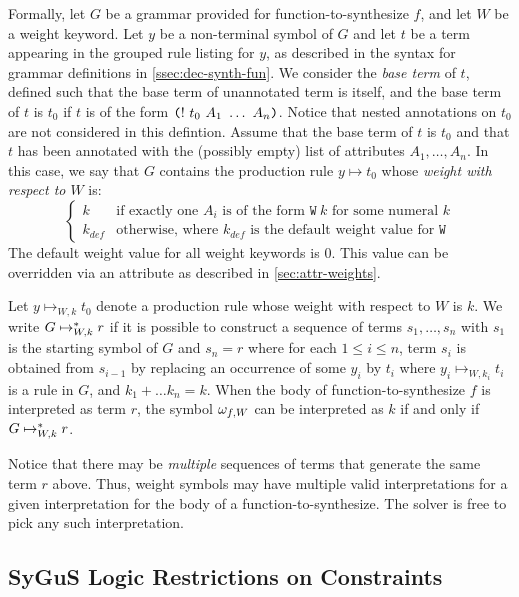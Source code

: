\documentclass[english,a4paper,10pt]{article}
\begin{document}
Formally,
let $G$ be a grammar provided for function-to-synthesize $f$, and let $W$ be a weight keyword.
Let $y$ be a non-terminal symbol of $G$ and let $t$ be a term appearing
in the grouped rule listing for $y$, as described in the syntax for grammar
definitions in \cref{ssec:dec-synth-fun}.
We consider the \emph{base term} of $t$, defined such that
the base term of unannotated term is itself, and
the base term of $t$ is $t_0$ if $t$ is of the form 
$\texttt{(}!\mbox{ }t_0\mbox{ }A_1\mbox{ }\ldots\mbox{ }A_n\texttt{)}$.
Notice that nested annotations on $t_0$ are not considered in this defintion.
Assume that the base term of $t$ is $t_0$ and that
$t$ has been annotated with the (possibly empty) list of attributes $A_1, \ldots, A_n$.
In this case, we say that $G$ contains
the production rule $y \mapsto t_0$ whose \emph{weight with respect to $W$} is:
\[
\begin{cases}
k & \text{if exactly one } A_i \text{ is of the form } \texttt{W}\ k \text{ for some numeral } k \\
k_{def} & \text{otherwise, where } k_{def} \text{ is the default weight value for } \texttt{W}
\end{cases}
\]
The default weight value for all weight keywords is $0$.
This value can be overridden via an attribute as described in \cref{sec:attr-weights}.

Let $y \mapsto_{W,k} t_0$ denote a production rule
whose weight with respect to $W$ is $k$.
We write $G \mapsto_{W,k}^{\ast} r$ if it is possible to construct a sequence of terms
$s_1, \ldots, s_n$
with $s_1$ is the starting symbol of $G$ and $s_n = r$
where for each $1 \leq i \leq n$, term $s_i$ is obtained from $s_{i-1}$ by
replacing an occurrence of some $y_i$ by $t_i$
where $y_i \mapsto_{W,k_i} t_i$ is a rule in $G$,
and $k_1 + \ldots k_n = k$.
When the body of function-to-synthesize $f$ is interpreted as term $r$,
the symbol $\omega_{f,W}$ can be interpreted as $k$ if and only if
$G \mapsto_{W,k}^{\ast} r$.

Notice that there may be \emph{multiple} sequences of terms that
generate the same term $r$ above.
Thus, weight symbols may have multiple valid
interpretations for a given interpretation for the body of a function-to-synthesize.
The solver is free to pick any such interpretation.

\subsection{SyGuS Logic Restrictions on Constraints}
\label{ssec:logicr-constraints}
\end{document}
